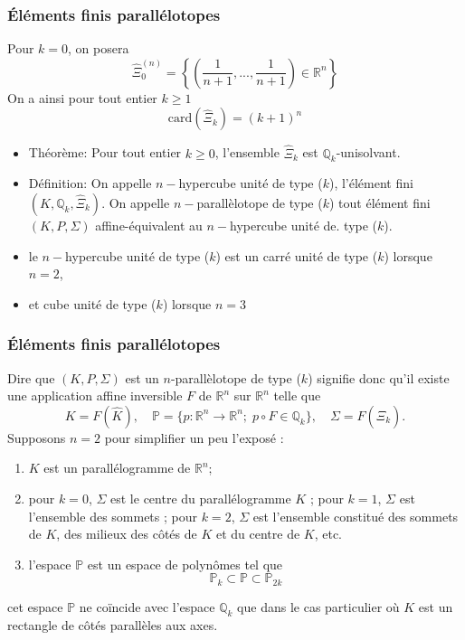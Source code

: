 \documentclass{beamer}
\begin{document}
\begin{frame}
\frametitle{Éléments finis parallélotopes}
Pour $k=0$, on posera  
\begin{equation}
\widehat{\Xi}_0^{(n)}=\left\{\left(\frac 1{n+1},...,\frac 1{n+1}\right)\in \mathbb{R}^n \right\}
\end{equation}
On a ainsi pour tout entier  $k\geq 1$                                                                                            \[\mbox{card} (\widehat{\Xi}_k) =  (k+ 1)^n\]
\begin{itemize}
\item Théorème: Pour tout entier $k\geq 0$, l'ensemble $\widehat{\Xi}_k$ est $\mathbb{Q}_k$-unisolvant.
\item Définition: On appelle $n-$hypercube unité de type ($k$),  l'élément fini $(K, \mathbb{Q}_k, \widehat{\Xi}_k)$. On appelle $n-$parallèlotope de type ($k$) tout élément fini $(K, P, \Sigma)$ affine-équivalent au $n-$hypercube unité de. type ($k$).
\item le $n-$hypercube unité de type ($k$) est un carré unité de type ($k$) lorsque $n=2$, 
\item et cube unité de type ($k$) lorsque $n = 3$
\end{itemize}
\end{frame}
\begin{frame}
\frametitle{Éléments finis parallélotopes}
Dire que $(K, P, \Sigma)$ est un $n$-parallèlotope de type 
($k$) signifie donc qu'il existe une application affine inversible $F$ de $\mathbb{R}^n$ sur $\mathbb{R}^n$ telle que
\begin{equation}
K=F(\widehat{K}),\quad \mathbb{P}=\{p: \mathbb{R}^n\to \mathbb{R}^n;\; p\circ F\in \mathbb{Q}_k\},\quad \Sigma=F(\widehat{\Xi}_k).
\end{equation}
Supposons $n=2$ pour simplifier un peu l'exposé :
\begin{enumerate}
\item $K$ est un parallélogramme de $\mathbb{R}^n$;
\item pour $k=0$, $\Sigma$ est le centre du parallélogramme $K$ ; pour $k =1$, $\Sigma$ est l'ensemble des sommets ; pour $k =2$, $\Sigma$ est l'ensemble constitué des sommets de $K$, des milieux des côtés de $K$ et du centre de $K$, etc.
\item l'espace $\mathbb{P}$ est un espace de polynômes tel que
\[\mathbb{P}_k\subset \mathbb{P}\subset \mathbb{P}_{2k}\]
\end{enumerate}

cet espace $\mathbb{P}$ ne coïncide avec l'espace $\mathbb{Q}_k$ que dans le cas particulier où $K$ est un rectangle de côtés parallèles aux axes.
\end{frame}
\end{document}
